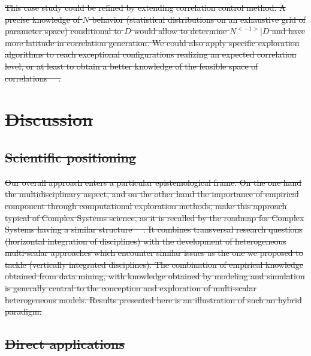 \documentclass{bmcart}
\providecommand{\DIFaddtex}[1]{{\protect\color{blue}\uwave{#1}}} %
\providecommand{\DIFdeltex}[1]{{\protect\color{red}\sout{#1}}}                      %
\providecommand{\DIFaddbegin}{} %
\providecommand{\DIFaddend}{} %
\providecommand{\DIFdelbegin}{} %
\providecommand{\DIFdelend}{} %
\providecommand{\DIFadd}[1]{\texorpdfstring{\DIFaddtex{#1}}{#1}} %
\providecommand{\DIFdel}[1]{\texorpdfstring{\DIFdeltex{#1}}{}} %
\newcommand{\DIFscaledelfig}{0.5}
\newlength{\DIFdelgraphicswidth} %
\newlength{\DIFdelgraphicsheight} %
\newcommand{\DIFaddincludegraphics}[2][]{{\color{blue}\fbox{\DIFOincludegraphics[#1]{#2}}}} %
\newcommand{\DIFdelincludegraphics}[2][]{%
\sbox{\DIFdelgraphicsbox}{\DIFOincludegraphics[#1]{#2}}%
\settoboxwidth{\DIFdelgraphicswidth}{\DIFdelgraphicsbox} %
\settoboxtotalheight{\DIFdelgraphicsheight}{\DIFdelgraphicsbox} %
\scalebox{\DIFscaledelfig}{%
\parbox[b]{\DIFdelgraphicswidth}{\usebox{\DIFdelgraphicsbox}\\[-\baselineskip] \rule{\DIFdelgraphicswidth}{0em}}\llap{\resizebox{\DIFdelgraphicswidth}{\DIFdelgraphicsheight}{%
\setlength{\unitlength}{\DIFdelgraphicswidth}%
\begin{picture}(1,1)%
\thicklines\linethickness{2pt} %
{\color[rgb]{1,0,0}\put(0,0){\framebox(1,1){}}}%
{\color[rgb]{1,0,0}\put(0,0){\line( 1,1){1}}}%
{\color[rgb]{1,0,0}\put(0,1){\line(1,-1){1}}}%
\end{picture}%
}\hspace*{3pt}}} %
} %
\DeclareRobustCommand{\DIFaddbegin}{\DIFOaddbegin \let\includegraphics\DIFaddincludegraphics} %
\DeclareRobustCommand{\DIFaddend}{\DIFOaddend \let\includegraphics\DIFOincludegraphics} %
\DeclareRobustCommand{\DIFdelbegin}{\DIFOdelbegin \let\includegraphics\DIFdelincludegraphics} %
\DeclareRobustCommand{\DIFdelend}{\DIFOaddend \let\includegraphics\DIFOincludegraphics} %
\begin{document}
\DIFdelbegin \DIFdel{This case study could be refined by extending correlation control method. A precise knowledge of $N$ behavior (statistical distributions on an exhaustive grid of parameter space) conditional to $D$ would allow to determine $N^{<-1>} | D$ and have more latitude in correlation generation. We could also apply specific exploration algorithms to reach exceptional configurations realizing an expected correlation level, or at least to obtain a better knowledge of the feasible space of correlations~\mbox{%
\cite{10.1371/journal.pone.0138212}}%
.
}%

\section*{\DIFdel{Discussion}}

\subsection*{\DIFdel{Scientific positioning}}

\DIFdel{Our overall approach enters a particular epistemological frame. On the one hand the multidisciplinary aspect, and on the other hand the importance of empirical component through computational exploration methods, make this approach typical of Complex Systems science, as it is recalled by the roadmap for Complex Systems having a similar structure~\mbox{%
\cite{2009arXiv0907.2221B}}%
. It combines transversal research questions (horizontal integration of disciplines) with the development of heterogeneous multi-scalar approaches which encounter similar issues as the one we proposed to tackle (vertically integrated disciplines).
The combination of empirical knowledge obtained from data mining, with knowledge obtained by modeling and simulation is generally central to the conception and exploration of multi-scalar heterogeneous models. Results presented here is an illustration of such an hybrid paradigm.
}%

\DIFdelend \subsection*{\DIFdelbegin \DIFdel{Direct applications}\DIFdelend \DIFaddbegin \DIFadd{Future work}\DIFaddend }
\end{document}
